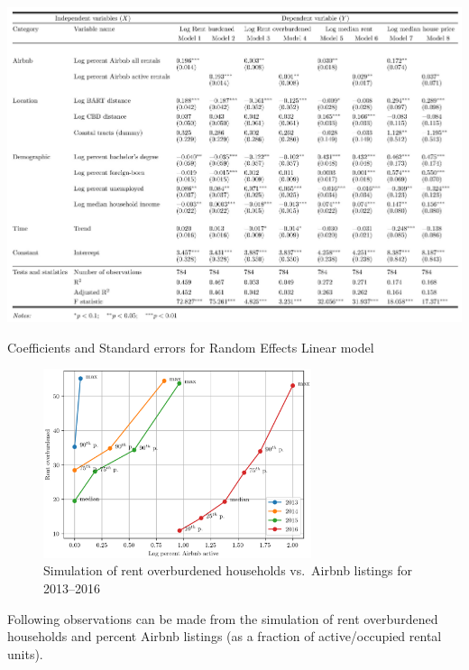 \documentclass[10pt,letterpaper,onecolumn]{article}
\begin{document}
\begin{table}[h]
  \hspace*{-0.8cm}
  \includegraphics[width=1.1\textwidth]{table2.jpg}
  \caption{Coefficients and Standard errors for Random Effects Linear model}
\end{table}
\begin{figure}[H]
  \centering
  \includegraphics[width=0.7\textwidth]{Rent_overburdened_vs_Log_percent_Airbnb_active.png}
  \caption{Simulation of rent overburdened households vs.\ Airbnb listings for 2013--2016}
\end{figure}

Following observations can be made from the simulation of rent
overburdened households and percent Airbnb listings (as a fraction of
active/occupied rental units).
\end{document}
